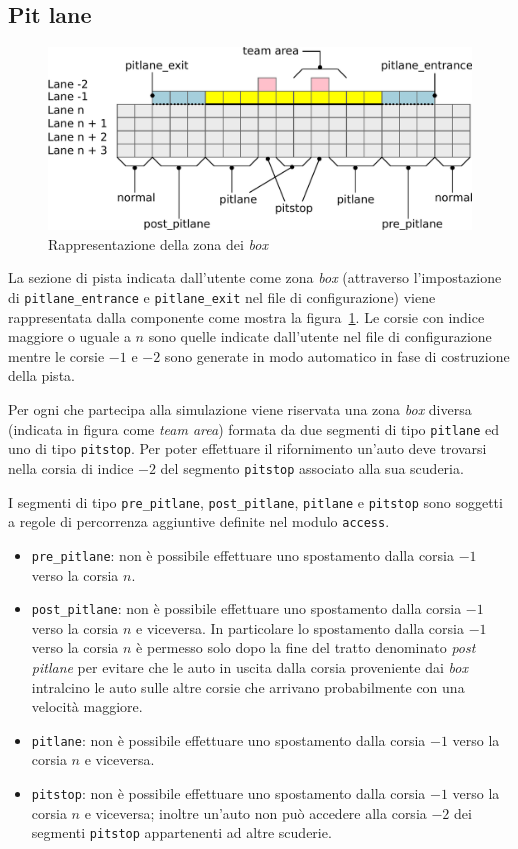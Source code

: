 \subsection{Pit lane}
\begin{figure}
\includegraphics[width=\textwidth]{diagrammi/PitLane}
\caption{Rappresentazione della zona dei \textit{box}}
\label{fig:pitLane}
\end{figure}

La sezione di pista indicata dall'utente come zona \textit{box} (attraverso l'impostazione di \texttt{pitlane\_entrance} e \texttt{pitlane\_exit} nel file di configurazione) viene rappresentata dalla componente \track{} come mostra la figura~\ref{fig:pitLane}. Le corsie con indice maggiore o uguale a $n$ sono quelle indicate dall'utente nel file di configurazione mentre le corsie $-1$ e $-2$ sono generate in modo automatico in fase di costruzione della pista.

Per ogni \team{} che partecipa alla simulazione viene riservata una zona \textit{box} diversa (indicata in figura come \textit{team area}) formata da due segmenti di tipo \texttt{pitlane} ed uno di tipo \texttt{pitstop}. Per poter effettuare il rifornimento un'auto deve trovarsi nella corsia di indice $-2$ del segmento \texttt{pitstop} associato alla sua scuderia.

I segmenti di tipo \texttt{pre\_pitlane}, \texttt{post\_pitlane}, \texttt{pitlane} e \texttt{pitstop} sono soggetti a regole di percorrenza aggiuntive definite nel modulo \texttt{access}.
\begin{itemize}
\item \texttt{pre\_pitlane}: non è possibile effettuare uno spostamento dalla corsia $-1$ verso la corsia $n$.
\item \texttt{post\_pitlane}: non è possibile effettuare uno spostamento dalla corsia $-1$ verso la corsia $n$ e viceversa. In particolare lo spostamento dalla corsia $-1$ verso la corsia $n$ è permesso solo dopo la fine del tratto denominato \textit{post pitlane} per evitare che le auto in uscita dalla corsia proveniente dai \textit{box} intralcino le auto sulle altre corsie che arrivano probabilmente con una velocità maggiore.
\item \texttt{pitlane}: non è possibile effettuare uno spostamento dalla corsia $-1$ verso la corsia $n$ e viceversa.
\item \texttt{pitstop}: non è possibile effettuare uno spostamento dalla corsia $-1$ verso la corsia $n$ e viceversa; inoltre un'auto non può accedere alla corsia $-2$ dei segmenti \texttt{pitstop} appartenenti ad altre scuderie.
\end{itemize}

